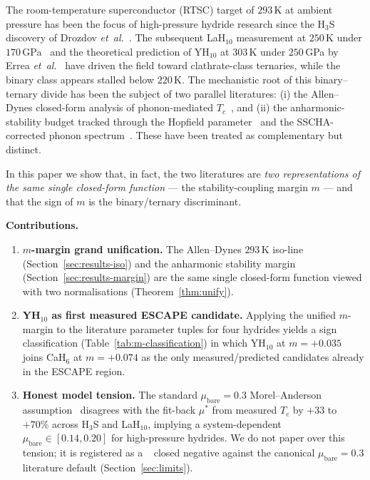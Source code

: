 \documentclass[11pt,a4paper]{article}
\providecommand{\tierRed}{🔴}
\begin{document}
The room-temperature superconductor (RTSC) target of $293$\,K at ambient
pressure has been the focus of high-pressure hydride research since the
H$_3$S discovery of Drozdov \emph{et~al.}~\cite{drozdov2015}. The subsequent
LaH$_{10}$ measurement at $250$\,K under $170$\,GPa~\cite{somayazulu2019}
and the theoretical prediction of YH$_{10}$ at $303$\,K under $250$\,GPa
by Errea \emph{et~al.}~\cite{errea2020} have driven the field toward
clathrate-class ternaries, while the binary class appears stalled below
$220$\,K. The mechanistic root of this binary--ternary divide has been
the subject of two parallel literatures: (i) the Allen--Dynes
closed-form analysis of phonon-mediated $T_c$~\cite{allenDynes1975}, and
(ii) the anharmonic-stability budget tracked through the Hopfield
parameter~\cite{hopfield1969} and the SSCHA-corrected phonon
spectrum~\cite{errea2014sscha}. These have been treated as complementary
but distinct.

In this paper we show that, in fact, the two literatures are
\emph{two representations of the same single closed-form function} ---
the stability-coupling margin $m$ --- and that the
sign of $m$ is the binary/ternary discriminant.

\medskip
\noindent\textbf{Contributions.}
\begin{enumerate}\itemsep0.3em
\item \textbf{$m$-margin grand unification.} The Allen--Dynes
$293$\,K iso-line (Section~\ref{sec:results-iso}) and the anharmonic
stability margin (Section~\ref{sec:results-margin}) are the same single
closed-form function viewed with two normalisations (Theorem~\ref{thm:unify}).
\item \textbf{YH$_{10}$ as first measured ESCAPE candidate.} Applying the
unified $m$-margin to the literature parameter tuples for four hydrides
yields a sign classification (Table~\ref{tab:m-classification}) in which
YH$_{10}$ at $m=+0.035$ joins CaH$_6$ at $m=+0.074$ as the only
measured/predicted candidates already in the ESCAPE region.
\item \textbf{Honest model tension.} The standard
$\mu_{\text{bare}}=0.3$ Morel--Anderson assumption~\cite{morelAnderson1962}
disagrees with the fit-back $\mu^*$ from measured $T_c$ by $+33$ to
$+70\%$ across H$_3$S and LaH$_{10}$, implying a system-dependent
$\mu_{\text{bare}}\in[0.14,0.20]$ for high-pressure hydrides. We do
not paper over this tension; it is registered as a \tierRed\ closed
negative against the canonical $\mu_{\text{bare}}=0.3$ literature
default (Section~\ref{sec:limits}).
\end{enumerate}
\end{document}
